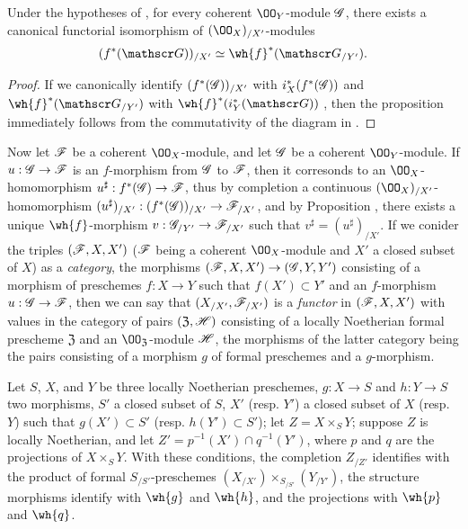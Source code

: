 \begin{prop}[10.9.5]
\label{1.10.9.5}
Under the hypotheses of , for every coherent $\OO_Y$-module $\mathscr{G}$, there exists a canonical functorial isomorphism of $(\OO_X)_{/X'}$-modules
\[
  (f^*(\sh{G}))_{/X'}\isoto\wh{f}^*(\sh{G}_{/Y'}).
\]
\end{prop}

\begin{proof}
\label{proof-1.10.9.5}
If we canonically identify $(f^*(\mathscr{G}))_{/X'}$ with $i_X^*(f^*(\mathscr{G}))$ and $\wh{f}^*(\sh{G}_{/Y'})$ with $\wh{f}^*(i_Y^*(\sh{G}))$ , then the proposition immediately follows from the commutativity of the diagram in .
\end{proof}

\begin{env}[10.9.6]
\label{1.10.9.6}
Now let $\mathscr{F}$ be a coherent $\OO_X$-module, and let $\mathscr{G}$ be a coherent $\OO_Y$-module.
If $u:\sh{G}\to\sh{F}$ is an $f$-morphism from $\mathscr{G}$ to $\mathscr{F}$, then it corresonds to an $\OO_X$-homomorphism $u^\sharp:f^*(\sh{G})\to\sh{F}$, thus by completion a continuous $(\OO_X)_{/X'}$-homomorphism $(u^\sharp)_{/X'}:(f^*(\sh{G}))_{/X'}\to\sh{F}_{/X'}$, and by Proposition , there exists a unique $\wh{f}$-morphism $v:\sh{G}_{/Y'}\to\sh{F}_{/X'}$
such that $v^\sharp=(u^\sharp)_{/X'}$.
If we conider the triples $(\mathscr{F},X,X')$ ($\mathscr{F}$ being a coherent $\OO_X$-module and $X'$ a closed subset of $X$) as a \emph{category}, the morphisms $(\sh{F},X,X')\to(\sh{G},Y,Y')$ consisting of a morphism of preschemes $f:X\to Y$ such that $f(X')\subset Y'$ and an $f$-morphism $u:\sh{G}\to\sh{F}$, then we can say that $(X_{/X'},\mathscr{F}_{/X'})$ is a \emph{functor} in $(\mathscr{F},X,X')$ with values in the category of pairs $(\mathfrak{Z},\mathscr{H})$ consisting of a locally Noetherian formal prescheme $\mathfrak{Z}$ and an $\OO_\mathfrak{Z}$-module $\mathscr{H}$, the morphisms of the latter category being the pairs consisting of a morphism $g$ of formal preschemes and a $g$-morphism.
\end{env}

\begin{prop}[10.9.7]
\label{1.10.9.7}
Let $S$, $X$, and $Y$ be three locally Noetherian preschemes, $g:X\to S$ and $h:Y\to S$ two morphisms, $S'$ a closed subset of $S$, $X'$ (resp. $Y'$) a closed subset of $X$ (resp. $Y$) such that $g(X')\subset S'$ (resp. $h(Y')\subset S'$); let $Z=X\times_S Y$; suppose $Z$ is locally Noetherian, and let $Z'=p^{-1}(X')\cap q^{-1}(Y')$, where $p$ and $q$ are the projections of $X\times_S Y$.
With these conditions, the completion $Z_{/Z'}$ identifies with the product of formal $S_{/S'}$-preschemes $(X_{/X'})\times_{S_{/S'}}(Y_{/Y'})$, the structure morphisms identify with $\wh{g}$ and $\wh{h}$, and the projections with $\wh{p}$ and $\wh{q}$.
\end{prop}

